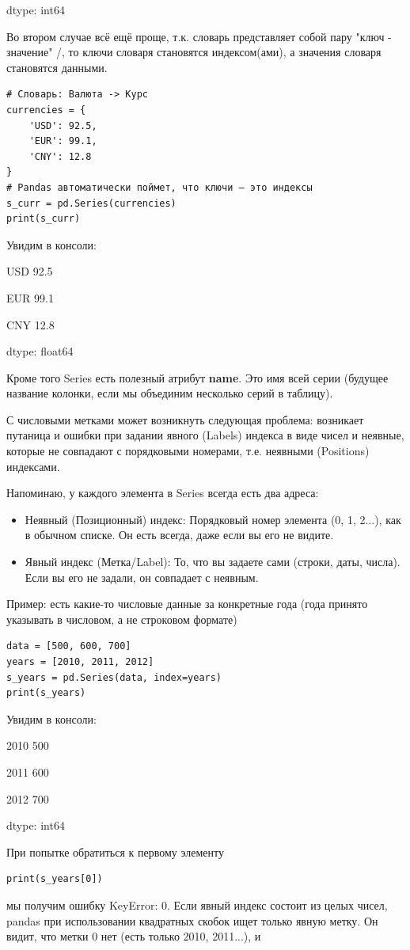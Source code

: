 \documentclass[pract]{SCWorks}
\begin{document}
dtype: int64

Во втором случае всё ещё проще, т.к. словарь представляет собой пару "ключ - значение" /, то ключи 
словаря становятся индексом(ами), а значения словаря становятся данными.

\begin{verbatim}
# Словарь: Валюта -> Курс
currencies = {
    'USD': 92.5,
    'EUR': 99.1,
    'CNY': 12.8
}
# Pandas автоматически поймет, что ключи — это индексы
s_curr = pd.Series(currencies)
print(s_curr)
\end{verbatim}
Увидим в консоли:

USD    92.5

EUR    99.1

CNY    12.8

dtype: float64

Кроме того Series есть полезный атрибут \textbf{name}. Это имя всей серии (будущее название колонки, 
если мы объединим несколько серий в таблицу).

С числовыми метками может возникнуть следующая проблема: возникает путаница и ошибки при задании явного 
(Labels) индекса в виде чисел и неявные, которые не совпадают с порядковыми номерами, т.е. неявными 
(Positions) индексами. 

Напоминаю, у каждого элемента в Series всегда есть два адреса:
\begin{itemize}
    \item Неявный (Позиционный) индекс: Порядковый номер элемента (0, 1, 2...), как в обычном списке. 
    Он есть всегда, даже если вы его не видите.
    \item Явный индекс (Метка/Label): То, что вы задаете сами (строки, даты, числа). 
    Если вы его не задали, он совпадает с неявным.
\end{itemize}

Пример: есть какие-то числовые данные за конкретные года (года принято указывать в числовом, а не строковом формате)

\begin{verbatim}
data = [500, 600, 700]
years = [2010, 2011, 2012]
s_years = pd.Series(data, index=years)
print(s_years)
\end{verbatim}
Увидим в консоли:

2010    500

2011    600

2012    700

dtype: int64

При попытке обратиться к первому элементу 
\begin{verbatim}
print(s_years[0])
\end{verbatim} 
мы получим ошибку KeyError: 0.
Если явный индекс состоит из целых чисел, pandas при использовании квадратных скобок ищет только явную 
метку. Он видит, что метки 0 нет (есть только 2010, 2011...), и 
\end{document}

